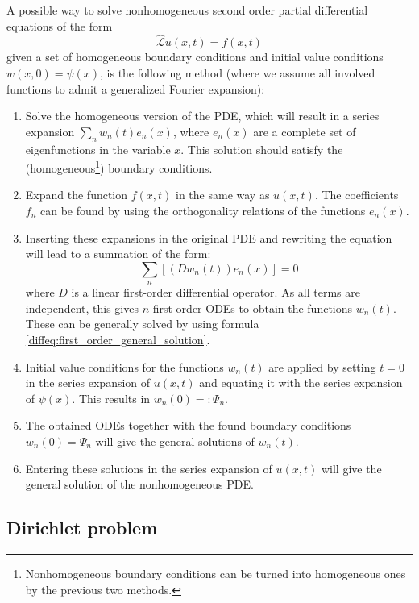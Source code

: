    \begin{method}
        A possible way to solve nonhomogeneous second order partial differential equations of the form \[\hat{\mathcal{L}}u(x,t) = f(x,t)\] given a set of homogeneous boundary conditions and initial value conditions $w(x,0) = \psi(x)$, is the following method (where we assume all involved functions to admit a generalized Fourier expansion):
        \begin{enumerate}
            \item Solve the homogeneous version of the PDE, which will result in a series expansion $\sum_nw_n(t)e_n(x)$, where $e_n(x)$ are a complete set of eigenfunctions in the variable $x$. This solution should satisfy the (homogeneous\footnote{Nonhomogeneous boundary conditions can be turned into homogeneous ones by the previous two methods.}) boundary conditions.
            \item Expand the function $f(x,t)$ in the same way as $u(x,t)$. The coefficients $f_n$ can be found by using the orthogonality relations of the functions $e_n(x)$.
            \item Inserting these expansions in the original PDE and rewriting the equation will lead to a summation of the form:
            \[\sum_n\left[\left(Dw_n(t)\right)e_n(x)\right] = 0\] where $D$ is a linear first-order differential operator. As all terms are independent, this gives $n$ first order ODEs to obtain the functions $w_n(t)$. These can be generally solved by using formula \ref{diffeq:first_order_general_solution}.
            \item Initial value conditions for the functions $w_n(t)$ are applied by setting $t=0$ in the series expansion of $u(x,t)$ and equating it with the series expansion of $\psi(x)$. This results in $w_n(0) =: \Psi_n$.
            \item The obtained ODEs together with the found boundary conditions $w_n(0) = \Psi_n$ will give the general solutions of $w_n(t)$.
            \item Entering these solutions in the series expansion of $u(x,t)$ will give the general solution of the nonhomogeneous PDE.
        \end{enumerate}
    \end{method}

\subsection{Dirichlet problem}

